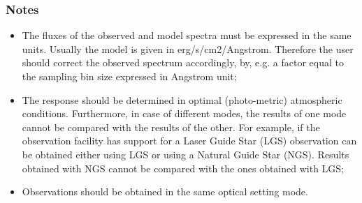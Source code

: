 \subsubsection{Notes}
\begin{itemize}
\item The fluxes of the observed and model spectra must be expressed in the same units. Usually the model is given in  erg/s/cm2/Angstrom. Therefore the user should correct the observed spectrum accordingly, by, e.g. a factor equal to the sampling bin size expressed in Angstrom unit;
\item The response should be determined in optimal (photo-metric) atmospheric conditions.
Furthermore, in case of different modes, the results of one mode cannot be compared with the results of the other. For example, if the observation facility has support for a Laser Guide Star (LGS) observation can be obtained either using LGS or using a Natural Guide Star (NGS). Results obtained with NGS cannot be compared with the ones obtained with LGS;
\item Observations should be obtained in the same optical setting mode.
\end{itemize}
